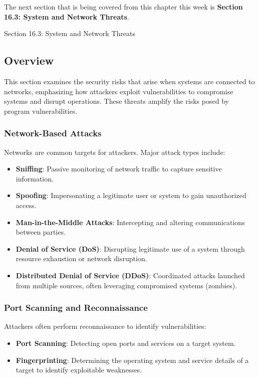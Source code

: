 The next section that is being covered from this chapter this week is \textbf{Section 16.3: System and Network Threats}.

\begin{notes}{Section 16.3: System and Network Threats}
    \subsection*{Overview}

    This section examines the security risks that arise when systems are connected to networks, emphasizing how attackers exploit vulnerabilities to compromise systems and disrupt operations. These 
    threats amplify the risks posed by program vulnerabilities.
    
    \subsubsection*{Network-Based Attacks}
    
    Networks are common targets for attackers. Major attack types include:
    \begin{itemize}
        \item \textbf{Sniffing}: Passive monitoring of network traffic to capture sensitive information.
        \item \textbf{Spoofing}: Impersonating a legitimate user or system to gain unauthorized access.
        \item \textbf{Man-in-the-Middle Attacks}: Intercepting and altering communications between parties.
        \item \textbf{Denial of Service (DoS)}: Disrupting legitimate use of a system through resource exhaustion or network disruption.
        \item \textbf{Distributed Denial of Service (DDoS)}: Coordinated attacks launched from multiple sources, often leveraging compromised systems (zombies).
    \end{itemize}
    
    \subsubsection*{Port Scanning and Reconnaissance}
    
    Attackers often perform reconnaissance to identify vulnerabilities:
    \begin{itemize}
        \item \textbf{Port Scanning}: Detecting open ports and services on a target system.
        \item \textbf{Fingerprinting}: Determining the operating system and service details of a target to identify exploitable weaknesses.
    \end{itemize}
    

\end{notes}
